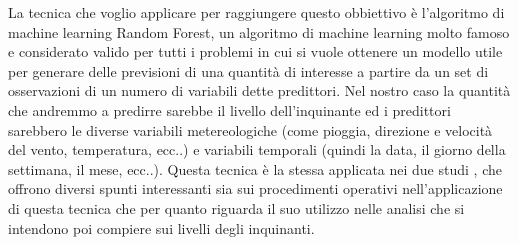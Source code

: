 \documentclass{article}
\begin{document}
La tecnica che voglio applicare per raggiungere questo obbiettivo è l'algoritmo di machine learning Random Forest, un algoritmo di machine learning molto famoso e considerato valido per tutti i problemi in cui si vuole ottenere un modello utile per generare delle previsioni di una quantità di interesse a partire da un set di osservazioni di un numero di variabili dette predittori. Nel nostro caso la quantità che andremmo a predirre sarebbe il livello dell'inquinante ed i predittori sarebbero le diverse variabili metereologiche (come pioggia, direzione e velocità del vento, temperatura, ecc..) e variabili temporali (quindi la data, il giorno della settimana, il mese, ecc..). Questa tecnica è la stessa applicata nei due studi \cite{grange2019using} \cite{grange2018random}, che offrono diversi spunti interessanti sia sui procedimenti operativi nell'applicazione di questa tecnica che per quanto riguarda il suo utilizzo nelle analisi che si intendono poi compiere sui livelli degli inquinanti.%
\end{document}
